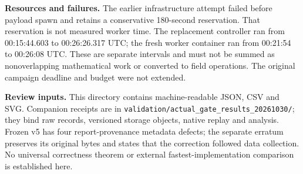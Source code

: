 \documentclass[11pt]{article}
\begin{document}
\textbf{Resources and failures.} The earlier infrastructure attempt failed before payload spawn and retains a conservative 180-second reservation. That reservation is not measured worker time. The replacement controller ran from 00:15:44.603 to 00:26:26.317 UTC; the fresh worker container ran from 00:21:54 to 00:26:08 UTC. These are separate intervals and must not be summed as nonoverlapping mathematical work or converted to field operations. The original campaign deadline and budget were not extended.

\textbf{Review inputs.} This directory contains machine-readable JSON, CSV and SVG. Companion receipts are in \texttt{validation/actual\_gate\_results\_20261030/}; they bind raw records, versioned storage objects, native replay and analysis. Frozen v5 has four report-provenance metadata defects; the separate erratum preserves its original bytes and states that the correction followed data collection. No universal correctness theorem or external fastest-implementation comparison is established here.
\end{document}
